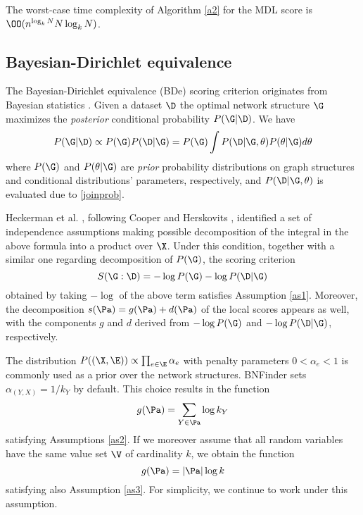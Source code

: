  \begin{theorem}
 The worst-case time complexity of Algorithm \ref{a2} for the MDL score is $\OO(n^{\log_k N}N\log_k N)$.
 \end{theorem}
 
\subsection{Bayesian-Dirichlet equivalence}

 The Bayesian-Dirichlet equivalence (BDe) scoring criterion originates from Bayesian statistics \cite{cooper92}. 
 Given a dataset $\D$ the optimal network structure $\G$ maximizes the \emph{posterior} conditional probability $P(\G|\D)$. 
 We have 
 $$P(\G|\D)\propto P(\G)P(\D|\G)=P(\G)\int P(\D|\G,\theta)P(\theta|\G)d\theta$$
 where $P(\G)$ and $P(\theta|\G)$ are \emph{prior} probability distributions on graph structures and conditional distributions' parameters, respectively, and $P(\D|\G,\theta)$ is evaluated due to \eqref{joinprob}.
 
 Heckerman et al. \cite{heckerman95}, following Cooper and Herskovits \cite{cooper92}, identified a set of independence assumptions making possible decomposition of the integral in the above formula into a product over $\X$.
 Under this condition, together with a similar one regarding decomposition of $P(\G)$, the scoring criterion
 $$S(\G:\D)=-\log P(\G)-\log P(\D|\G)$$
 obtained by taking $-\log$ of the above term satisfies Assumption \ref{as1}. 
 Moreover, the decomposition $s(\Pa)=g(\Pa)+d(\Pa)$ of the local scores appears as well, with the components $g$ and $d$ derived from $-\log P(\G)$ and $-\log P(\D|\G)$, respectively.


 The distribution $P((\X,\E))\propto\prod_{e\in\E}\alpha_{e}$ 
 with penalty parameters $0<\alpha_e<1$ 
 is commonly used as a prior over the network structures. 
 BNFinder sets $\alpha_{(Y,X)}=1/k_Y$ by default.
 This choice results in the function 
 $$g(\Pa)=\sum_{Y\in\Pa}\log k_Y$$ 
 satisfying Assumptions \ref{as2}.
 If we moreover assume that all random variables 
 have the same value set $\V$ of cardinality $k$,
 we obtain the function
 $$g(\Pa)=|\Pa|\log k$$ 
 satisfying also Assumption \ref{as3}.
 For simplicity, we continue to work under this assumption.

